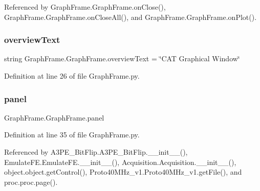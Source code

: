 Referenced by Graph\+Frame.\+Graph\+Frame.\+on\+Close(), Graph\+Frame.\+Graph\+Frame.\+on\+Close\+All(), and Graph\+Frame.\+Graph\+Frame.\+on\+Plot().

\mbox{\label{classGraphFrame_1_1GraphFrame_a9abea07b31cb5c6c71077bb51ed5906e}} 
\subsubsection{\texorpdfstring{overview\+Text}{overviewText}}
{\footnotesize\ttfamily string Graph\+Frame.\+Graph\+Frame.\+overview\+Text = \char`\"{}C\+AT Graphical Window\char`\"{}\hspace{0.3cm}{\ttfamily [static]}}



Definition at line 26 of file Graph\+Frame.\+py.

\mbox{\label{classGraphFrame_1_1GraphFrame_af52ab0f13e5117c0cdaa3cade3f04eda}} 
\subsubsection{\texorpdfstring{panel}{panel}}
{\footnotesize\ttfamily Graph\+Frame.\+Graph\+Frame.\+panel}



Definition at line 35 of file Graph\+Frame.\+py.



Referenced by A3\+P\+E\+\_\+\+Bit\+Flip.\+A3\+P\+E\+\_\+\+Bit\+Flip.\+\_\+\+\_\+init\+\_\+\+\_\+(), Emulate\+F\+E.\+Emulate\+F\+E.\+\_\+\+\_\+init\+\_\+\+\_\+(), Acquisition.\+Acquisition.\+\_\+\+\_\+init\+\_\+\+\_\+(), object.\+object.\+get\+Control(), Proto40\+M\+Hz\+\_\+v1.\+Proto40\+M\+Hz\+\_\+v1.\+get\+File(), and proc.\+proc.\+page().

\mbox{\label{classGraphFrame_1_1GraphFrame_abe229e95196e9132c31fc47bb1342d39}} 
